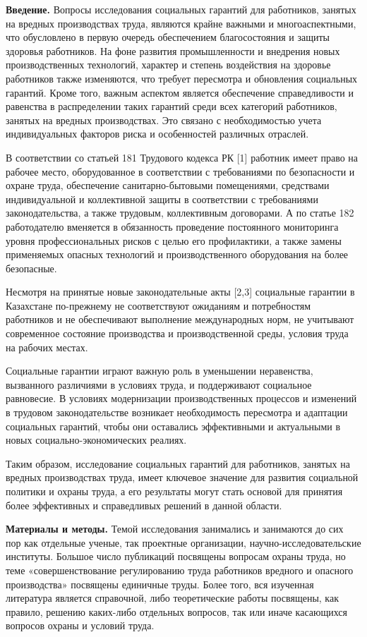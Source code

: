 \begin{multicols}{2}
{\bfseries Введение.} Вопросы исследования социальных гарантий для
работников, занятых на вредных производствах труда, являются крайне
важными и многоаспектными, что обусловлено в первую очередь обеспечением
благосостояния и защиты здоровья работников. На фоне развития
промышленности и внедрения новых производственных технологий, характер и
степень воздействия на здоровье работников также изменяются, что требует
пересмотра и обновления социальных гарантий. Кроме того, важным аспектом
является обеспечение справедливости и равенства в распределении таких
гарантий среди всех категорий работников, занятых на вредных
производствах. Это связано с необходимостью учета индивидуальных
факторов риска и особенностей различных отраслей.

В соответствии со статьей 181 Трудового кодекса РК {[}1{]} работник
имеет право на рабочее место, оборудованное в соответствии с
требованиями по безопасности и охране труда, обеспечение
санитарно-бытовыми помещениями, средствами индивидуальной и коллективной
защиты в соответствии с требованиями законодательства, а также трудовым,
коллективным договорами. А по статье 182 работодателю вменяется в
обязанность проведение постоянного мониторинга уровня профессиональных
рисков с целью его профилактики, а также замены применяемых опасных
технологий и производственного оборудования на более безопасные.

Несмотря на принятые новые законодательные акты {[}2,3{]} социальные
гарантии в Казахстане по-прежнему не соответствуют ожиданиям и
потребностям работников и не обеспечивают выполнение международных норм,
не учитывают современное состояние производства и производственной
среды, условия труда на рабочих местах.

Социальные гарантии играют важную роль в уменьшении неравенства,
вызванного различиями в условиях труда, и поддерживают социальное
равновесие. В условиях модернизации производственных процессов и
изменений в трудовом законодательстве возникает необходимость пересмотра
и адаптации социальных гарантий, чтобы они оставались эффективными и
актуальными в новых социально-экономических реалиях.

Таким образом, исследование социальных гарантий для работников, занятых
на вредных производствах труда, имеет ключевое значение для развития
социальной политики и охраны труда, а его результаты могут стать основой
для принятия более эффективных и справедливых решений в данной области.

{\bfseries Материалы и методы.} Темой исследования занимались и занимаются
до сих пор как отдельные ученые, так проектные организации,
научно-исследовательские институты. Большое число публикаций посвящены
вопросам охраны труда, но теме «совершенствование регулированию труда
работников вредного и опасного производства» посвящены единичные труды.
Более того, вся изученная литература является справочной, либо
теоретические работы посвящены, как правило, решению каких-либо
отдельных вопросов, так или иначе касающихся вопросов охраны и условий
труда.


\end{multicols}
